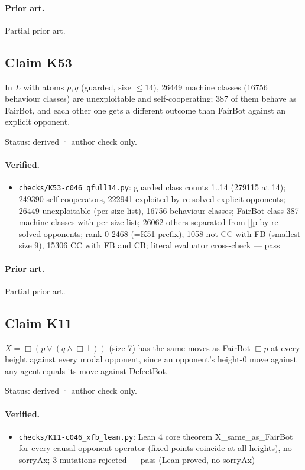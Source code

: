 \documentclass{article}
\begin{document}
\paragraph{Prior art.} Partial prior art.

\subsection*{Claim K53}

In $L$ with atoms $p,q$ (guarded, size $\le14$), 26449 machine classes (16756 behaviour classes) are unexploitable and self-cooperating; 387 of them behave as FairBot, and each other one gets a different outcome than FairBot against an explicit opponent.

Status: derived · author check only.

\paragraph{Verified.}
\begin{itemize}
\item \texttt{checks/K53-c046\_qfull14.py}: guarded class counts 1..14 (279115 at 14); 249390 self-cooperators, 222941 exploited by re-solved explicit opponents; 26449 unexploitable (per-size list), 16756 behaviour classes; FairBot class 387 machine classes with per-size list; 26062 others separated from []p by re-solved opponents; rank-0 2468 (=K51 prefix); 1058 not CC with FB (smallest size 9), 15306 CC with FB and CB; literal evaluator cross-check --- pass
\end{itemize}

\paragraph{Prior art.} Partial prior art.

\subsection*{Claim K11}

$X=\Box(p\vee(q\wedge\Box\bot))$ (size 7) has the same moves as FairBot $\Box p$ at every height against every modal opponent, since an opponent's height-0 move against any agent equals its move against DefectBot.

Status: derived · author check only.

\paragraph{Verified.}
\begin{itemize}
\item \texttt{checks/K11-c046\_xfb\_lean.py}: Lean 4 core theorem X\_same\_as\_FairBot for every causal opponent operator (fixed points coincide at all heights), no sorryAx; 3 mutations rejected --- pass (Lean-proved, no sorryAx)
\end{itemize}
\end{document}
